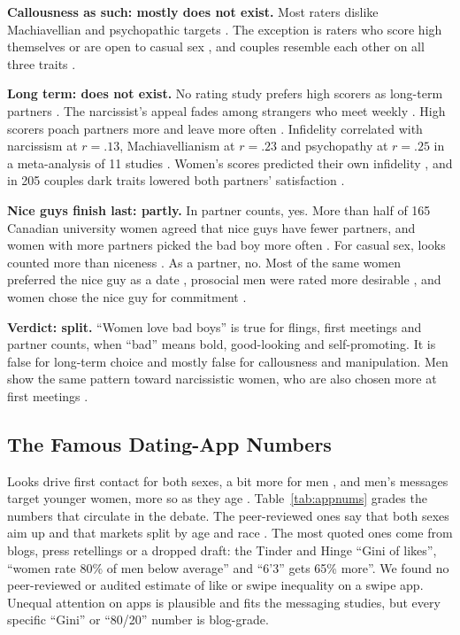\documentclass[conference,a4paper]{IEEEtran}
\begin{document}
\textbf{Callousness as such: mostly does not exist.} Most raters dislike Machiavellian and psychopathic targets \cite{rauthmann2013,watts2019}. The exception is raters who score high themselves or are open to casual sex \cite{jonason2015birds,watts2019,marcinkowska2015}, and couples resemble each other on all three traits \cite{richards2024}.

\textbf{Long term: does not exist.} No rating study prefers high scorers as long-term partners \cite{jonason2015birds,dragostinov2025}. The narcissist's appeal fades among strangers who meet weekly \cite{paulhus1998,leckelt2015}. High scorers poach partners more and leave more often \cite{jonason2010poach}. Infidelity correlated with narcissism at $r=.13$, Machiavellianism at $r=.23$ and psychopathy at $r=.25$ in a meta-analysis of 11 studies \cite{ataman2025}. Women's scores predicted their own infidelity \cite{brewer2015}, and in 205 couples dark traits lowered both partners' satisfaction \cite{kardum2024}.

\textbf{Nice guys finish last: partly.} In partner counts, yes. More than half of 165 Canadian university women agreed that nice guys have fewer partners, and women with more partners picked the bad boy more often \cite{herold1999}. For casual sex, looks counted more than niceness \cite{urbaniak2003}. As a partner, no. Most of the same women preferred the nice guy as a date \cite{herold1999}, prosocial men were rated more desirable \cite{jensencampbell1995}, and women chose the nice guy for commitment \cite{mcdaniel2005}.

\textbf{Verdict: split.} ``Women love bad boys'' is true for flings, first meetings and partner counts, when ``bad'' means bold, good-looking and self-promoting. It is false for long-term choice and mostly false for callousness and manipulation. Men show the same pattern toward narcissistic women, who are also chosen more at first meetings \cite{jauk2016}.

\subsection{The Famous Dating-App Numbers}
Looks drive first contact for both sexes, a bit more for men \cite{hitsch2010qme,lee2008}, and men's messages target younger women, more so as they age \cite{hitsch2010qme,skopek2011age}. Table~\ref{tab:appnums} grades the numbers that circulate in the debate. The peer-reviewed ones say that both sexes aim up and that markets split by age and race \cite{bruch2018,bruch2019,hitsch2010qme}. The most quoted ones come from blogs, press retellings or a dropped draft: the Tinder and Hinge ``Gini of likes'', ``women rate 80\% of men below average'' and ``6'3'' gets 65\% more''. We found no peer-reviewed or audited estimate of like or swipe inequality on a swipe app. Unequal attention on apps is plausible and fits the messaging studies, but every specific ``Gini'' or ``80/20'' number is blog-grade.
\end{document}
